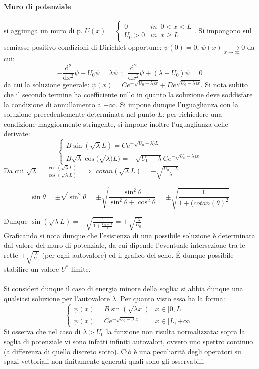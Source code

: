 \documentclass[10pt]{article}
\theoremstyle{plain}
\begin{document}
\paragraph{Muro di potenziale} si aggiunga un muro di p. $\displaystyle U(x) = \begin{cases}
    0 & in \enspace 0<x<L\\ U_0 > 0 & in \enspace x \geq L
\end{cases}$. Si impongono sul semiasse positivo condizioni di Dirichlet opportune: $\psi(0) = 0$, $\psi(x) \xrightarrow[x \rightarrow \infty]{} 0$ da cui: 
\[- \frac{\textrm{d}^2}{\textrm{d}x^2}\psi + U_0 \psi= \lambda \psi \enspace ; \enspace \frac{\textrm{d}^2}{\textrm{d}x^2}\psi + (\lambda - U_0) \psi = 0\]
da cui la soluzione generale: $\displaystyle \psi(x) = C e^{\displaystyle - \sqrt{U_0 - \lambda) x}} + D  e^{\displaystyle \sqrt{U_0 - \lambda) x}}$. Si nota subito che il secondo termine ha coefficiente nullo in quanto la soluzione deve soddisfare la condizione di annullamento a $+\infty$. Si impone dunque l'uguaglianza con la soluzione precedentemente determinata nel punto $L$: per richiedere una condizione maggiormente stringente, si impone inoltre l'uguaglianza delle derivate:
\[\begin{cases}
    B \sin(\sqrt{\lambda}L) = C  e^{\displaystyle - \sqrt{U_0 - \lambda) L}}\\
    B \sqrt{\lambda} \cos(\sqrt{\lambda) L)} = - \sqrt{U_0 - \lambda} C e^{\displaystyle - \sqrt{U_0 - \lambda) x}}
\end{cases}\]
Da cui $\displaystyle \sqrt{\lambda} = \frac{\cos(\sqrt{\lambda} L)}{\cos(\sqrt{\lambda} L)}$ $\implies$ $\displaystyle cotan(\sqrt{\lambda} L) = - \sqrt{\frac{U_0 - \lambda}{\lambda}}$
\begin{oss}[trigonometrica]
    \[\sin \theta = \pm \sqrt{\sin^2 \theta} = \pm \sqrt{\frac{\sin^2 \theta}{\sin^2 \theta + \cos^2 \theta}} = \pm \sqrt{\frac{1}{1 + (cotan (\theta)^2}}\]
\end{oss}
Dunque $\displaystyle \sin(\sqrt{\lambda} L) = \pm \sqrt{\frac{1}{\displaystyle 1 + \frac{U_0 - \lambda}{\lambda}}} = \pm \sqrt{\frac{\lambda}{U_0}}$
\\Graficando si nota dunque che l'esistenza di una possibile soluzione è determinata dal valore del muro di potenziale, da cui dipende l'eventuale intersezione tra le rette $\displaystyle \pm \sqrt{\frac{\lambda}{U_0}}$ (per ogni autovalore) ed il grafico del seno. \'E dunque possibile stabilire un valore $U^{\ast}$ limite.
\\~\\Si consideri dunque il caso di energia minore della soglia: si abbia dunque una qualsiasi soluzione per l'autovalore $\lambda$. Per quanto visto essa ha la forma:
\[\begin{cases}
    \psi(x) = B \sin(\sqrt{\lambda x}) & x \in ]0,L[\\
    \psi(x) = C e^{- \sqrt{U_0 - \lambda} x} & x \in[L, +\infty[
\end{cases}\]
Si osserva che nel caso di $\lambda > U_0$ la funzione non risulta normalizzata: sopra la soglia di potenziale vi sono infatti infiniti autovalori, ovvero uno spettro continuo (a differenza di quello discreto sotto). Ciò è una peculiarità degli operatori su spazi vettoriali non finitamente generati quali sono gli osservabili.
\end{document}
